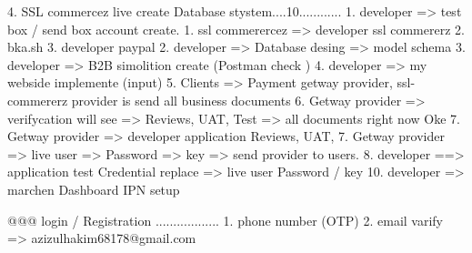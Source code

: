 
4. SSL commercez live create Database stystem....10............
   1. developer =>  test box / send box account create.
      1. ssl commerercez => developer ssl commererz
      2. bka.sh 
      3. developer paypal 
   2. developer => Database desing => model schema
   3. developer => B2B simolition create (Postman check )
   4. developer => my webside  implemente (input)
   5. Clients => Payment getway provider, ssl-commererz provider is send all business documents 
   6. Getway provider => verifycation will see => Reviews, UAT, Test => all documents right now Oke
   7. Getway provider => developer application Reviews, UAT, 
   7. Getway provider => live user => Password => key => send provider to users.
   8. developer ==> application test Credential replace => live user Password / key 
   10. developer => marchen Dashboard IPN setup

@@@ login / Registration ..................
    1. phone number (OTP)
    2. email varify => azizulhakim68178@gmail.com 
    